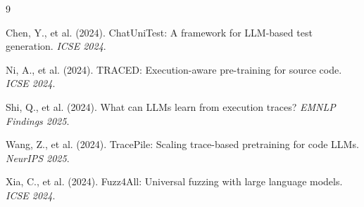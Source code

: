 \documentclass[11pt]{article}
\begin{document}

\begin{thebibliography}{9}

Chen, Y., et al. (2024). ChatUniTest: A framework for LLM-based test generation. \textit{ICSE 2024}.

Ni, A., et al. (2024). TRACED: Execution-aware pre-training for source code. \textit{ICSE 2024}.

Shi, Q., et al. (2024). What can LLMs learn from execution traces? \textit{EMNLP Findings 2025}.

Wang, Z., et al. (2024). TracePile: Scaling trace-based pretraining for code LLMs. \textit{NeurIPS 2025}.

Xia, C., et al. (2024). Fuzz4All: Universal fuzzing with large language models. \textit{ICSE 2024}.

\end{thebibliography}
\end{document}
